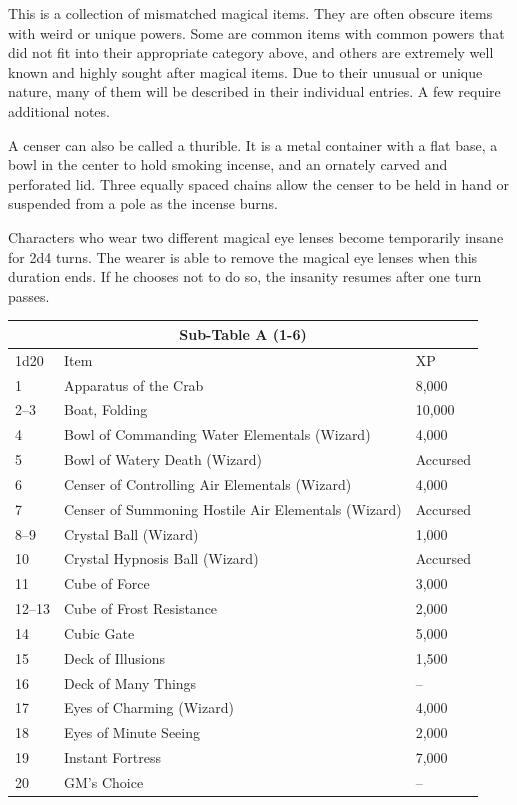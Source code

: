 \begin{multicols}{2}
This is a collection of mismatched magical items.  They are often obscure items with weird or unique powers. Some are common items with common powers that did not fit into their appropriate category above, and others are extremely well known and highly sought after magical items.  Due to their unusual or unique nature, many of them will be described in their individual entries.  A few require additional notes.

A censer can also be called a thurible.  It is a metal container with a flat base, a bowl in the center to hold smoking incense, and an ornately carved and perforated lid.  Three equally spaced chains allow the censer to be held in hand or suspended from a pole as the incense burns.

Characters who wear two different magical eye lenses become temporarily insane for 2d4 turns.  The wearer is able to remove the magical eye lenses when this duration ends.  If he chooses not to do so, the insanity resumes after one turn passes.

\noindent \begin{minipage}{\columnwidth}

\noindent \begin{tabular}{|p{}|p{}|p{}|}
\multicolumn{3}{c}{Sub-Table A (1-6)} \\
\hline
1d20	& Item	& XP \\
\hline\hline
\rowcolor[gray]{0.9}1	& Apparatus of the Crab	& 8,000 \\
2--3	& Boat, Folding	& 10,000 \\
\rowcolor[gray]{0.9}4	& Bowl of Commanding Water Elementals (Wizard)	& 4,000 \\
5	& Bowl of Watery Death (Wizard)	& Accursed \\
\rowcolor[gray]{0.9}6	& Censer of Controlling Air Elementals (Wizard)	& 4,000 \\
7	& Censer of Summoning Hostile Air Elementals (Wizard)	& Accursed \\
\rowcolor[gray]{0.9}8--9	& Crystal Ball (Wizard)	& 1,000 \\
10	& Crystal Hypnosis Ball (Wizard)	& Accursed \\
\rowcolor[gray]{0.9}11	& Cube of Force	& 3,000 \\
12--13	& Cube of Frost Resistance	& 2,000 \\
\rowcolor[gray]{0.9}14	& Cubic Gate	& 5,000 \\
15	& Deck of Illusions	& 1,500 \\
\rowcolor[gray]{0.9}16	& Deck of Many Things	& -- \\
17	& Eyes of Charming (Wizard)	& 4,000 \\
\rowcolor[gray]{0.9}18	& Eyes of Minute Seeing	& 2,000 \\
19	& Instant Fortress	& 7,000 \\
\rowcolor[gray]{0.9}20	& GM's Choice	& -- \\
\hline
\end{tabular}


\end{minipage}
\end{multicols}
